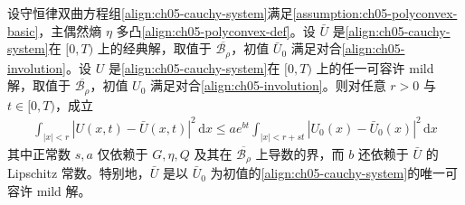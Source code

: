 \documentclass[../../main.tex]{subfiles}
\begin{document}
\begin{theorem}\label{theorem:ch05-polyconvex-stability}
设守恒律双曲方程组\eqref{align:ch05-cauchy-system}满足\cref{assumption:ch05-polyconvex-basic}，主偶然熵 $\eta$ 多凸\eqref{align:ch05-polyconvex-def}。设 $\bar{U}$ 是\eqref{align:ch05-cauchy-system}在 $[0,T)$ 上的经典解，取值于 $\overline{\mathscr{B}_{\rho}}$，初值 $\bar{U}_{0}$ 满足对合\eqref{align:ch05-involution}。设 $U$ 是\eqref{align:ch05-cauchy-system}在 $[0,T)$ 上的任一可容许 mild 解，取值于 $\overline{\mathscr{B}_{\rho}}$，初值 $U_{0}$ 满足对合\eqref{align:ch05-involution}。则对任意 $r>0$ 与 $t\in[0,T)$，成立
\begin{align}
\int_{|x|<r}|U(x,t)-\bar{U}(x,t)|^{2}\,\mathrm{d}x\leqslant ae^{bt}\int_{|x|<r+st}|U_{0}(x)-\bar{U}_{0}(x)|^{2}\,\mathrm{d}x\label{align:ch05-polyconvex-stability-est}
\end{align}
其中正常数 $s,a$ 仅依赖于 $G,\eta,Q$ 及其在 $\overline{\mathscr{B}_{\rho}}$ 上导数的界，而 $b$ 还依赖于 $\bar{U}$ 的 Lipschitz 常数。特别地，$\bar{U}$ 是以 $\bar{U}_{0}$ 为初值的\eqref{align:ch05-cauchy-system}的唯一可容许 mild 解。
\end{theorem}
\end{document}
